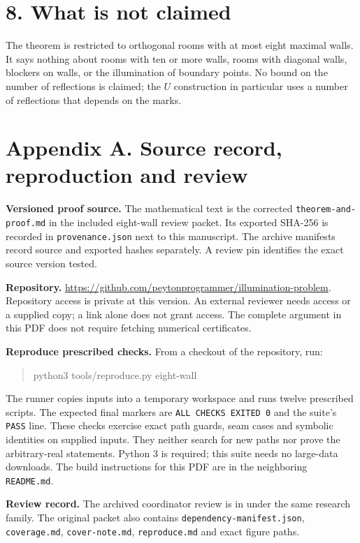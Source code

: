 \documentclass[11pt]{article}
\begin{document}
\section*{8. What is not claimed}
The theorem is restricted to orthogonal rooms with at most eight maximal walls. It says nothing about rooms with ten or more walls, rooms with diagonal walls, blockers on walls, or the illumination of boundary points. No bound on the number of reflections is claimed; the \(U\) construction in particular uses a number of reflections that depends on the marks.

\clearpage
\section*{Appendix A. Source record, reproduction and review}
\textbf{Versioned proof source.} The mathematical text is the corrected \texttt{theorem-and-proof.md} in the included eight-wall review packet. Its exported SHA-256 is recorded in \texttt{provenance.json} next to this manuscript. The archive manifests record source and exported hashes separately. A review pin identifies the exact source version tested.

\textbf{Repository.} \url{https://github.com/peytonprogrammer/illumination-problem}. Repository access is private at this version. An external reviewer needs access or a supplied copy; a link alone does not grant access. The complete argument in this PDF does not require fetching numerical certificates.

\textbf{Reproduce prescribed checks.} From a checkout of the repository, run:
\begin{quote}\ttfamily\small
python3 tools/reproduce.py eight-wall
\end{quote}
The runner copies inputs into a temporary workspace and runs twelve prescribed scripts. The expected final markers are \texttt{ALL CHECKS EXITED 0} and the suite's \texttt{PASS} line. These checks exercise exact path guards, seam cases and symbolic identities on supplied inputs. They neither search for new paths nor prove the arbitrary-real statements. Python 3 is required; this suite needs no large-data downloads. The build instructions for this PDF are in the neighboring \texttt{README.md}.

\textbf{Review record.} The archived coordinator review is in  under the same research family. The original packet also contains \texttt{dependency-manifest.json}, \texttt{coverage.md}, \texttt{cover-note.md}, \texttt{reproduce.md} and exact figure paths.
\end{document}
